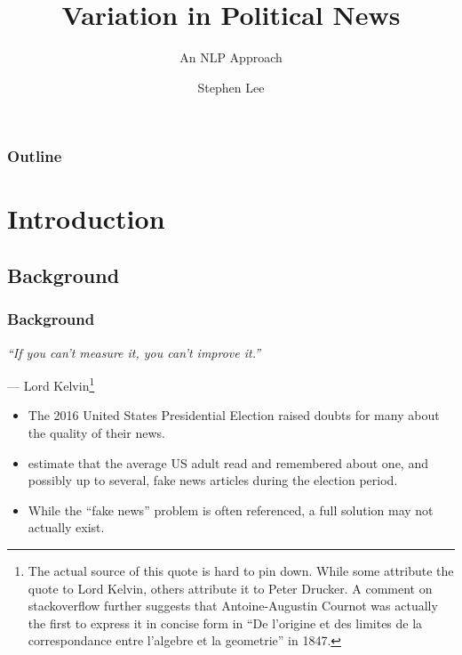 \documentclass{beamer}
\title{Variation in Political News}
\subtitle{An NLP Approach}
\author{Stephen Lee}
\institute{University of Memphis}
\begin{document}
	

	\begin{frame}
		\maketitle
	\end{frame}

    \begin{frame}
    	\frametitle{Outline}
    	\tableofcontents
    \end{frame}


\section{Introduction}

    \subsection{Background}
   
    \begin{frame}
   	    \frametitle{Background}
   	    \begin{center}
   	    	\textit{``If you can't measure it, you can't improve it.''}
   	    \end{center}
   	    \begin{flushright}
   	    	--- Lord Kelvin\footnote{The actual source of this quote is hard to pin down. While some attribute the quote to Lord Kelvin, others attribute it to Peter Drucker. A comment on stackoverflow further suggests that Antoine-Augustin Cournot was actually the first to express it in concise form in ``De l'origine et des limites de la correspondance entre l'algebre et la geometrie'' in 1847.}
   	    \end{flushright}
       
       \begin{itemize}
       	\item The 2016 United States Presidential Election raised doubts for many about the quality of their news.
       	\item \citet{allcott2017social} estimate that the average US adult read and remembered about one, and possibly up to several, fake news articles during the election period.
       	\item While the ``fake news'' problem is often referenced, a full solution may not actually exist. 
       \end{itemize}
    \end{frame}
   
\end{document}
